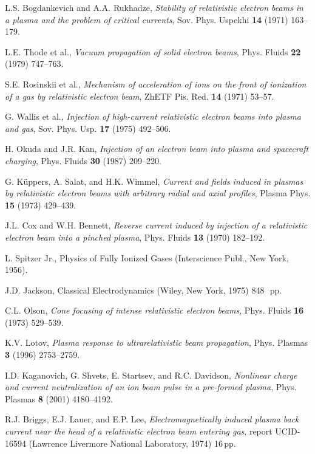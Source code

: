 \documentclass [12pt,a4paper,     ]{report} %
\begin{document}
\begin{enumerate}
 L.S. Bogdankevich and A.A. Rukhadze, \emph{Stability of relativistic electron beams in a plasma and the problem of critical currents}, Sov. Phys. Uspekhi {\bf 14} (1971) 163--179.

 L.E. Thode et al., \emph{Vacuum propagation of solid electron beams}, Phys. Fluids {\bf 22} (1979) 747--763.

  S.E. Rosinskii et al., \emph{Mechanism of acceleration of ions on the front of ionization of a gas by relativistic electron beam}, ZhETF Pis. Red. {\bf 14}  (1971) 53--57.

 G. Wallis et al., \emph{Injection of high-current relativistic electron beams into plasma and gas}, Sov. Phys. Usp. {\bf 17} (1975) 492--506.

 H. Okuda and J.R. Kan, \emph{Injection of an electron beam into plasma and spacecraft charging}, Phys. Fluids {\bf 30} (1987) 209--220.

 G. K\"uppers, A. Salat, and H.K. Wimmel, \emph{Current and fields induced in plasmas by relativistic electron beams with arbitrary radial and axial profiles}, Plasma Phys. {\bf 15} (1973) 429--439.

  J.L. Cox and W.H. Bennett, \emph{Reverse current induced by injection of a relativistic electron beam into a pinched plasma}, Phys. Fluids {\bf 13} (1970) 182--192.


 L. Spitzer Jr., Physics of Fully Ionized Gases (Interscience Publ., New York, 1956).

  J.D. Jackson, Classical Electrodynamics (Wiley, New York, 1975) 848~\,pp.

 C.L. Olson, \emph{Cone focusing of intense relativistic electron beams}, Phys. Fluids {\bf 16} (1973) 529--539.  

 K.V. Lotov, \emph{Plasma response to ultrarelativistic beam propagation}, Phys. Plasmas {\bf 3} (1996) 2753--2759.

 I.D. Kaganovich, G. Shvets, E. Startsev, and R.C. Davidson, \emph{Nonlinear charge and current neutralization of an ion beam pulse in a pre-formed plasma}, Phys. Plasmas {\bf 8} (2001) 4180--4192.

 R.J. Briggs, E.J. Lauer, and E.P. Lee, \emph{Electromagnetically induced plasma back current near the head of a relativistic electron beam entering gas}, report UCID-16594 (Lawrence Livermore National Laboratory, 1974) 16\,pp.


\end{enumerate}
\end{document}
